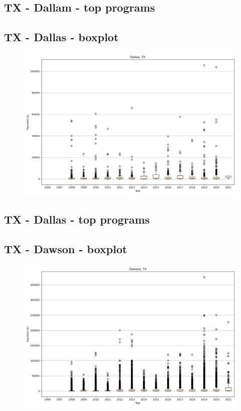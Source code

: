 \subsection*{TX - Dallam - top programs}

\newpage
\subsection*{TX - Dallas - boxplot}
\begin{figure}[h]
\centering
\includegraphics[width=7in]{../output/boxplots/counties/Dallas-TX_boxplot.png}
\end{figure}


\subsection*{TX - Dallas - top programs}

\newpage
\subsection*{TX - Dawson - boxplot}
\begin{figure}[h]
\centering
\includegraphics[width=7in]{../output/boxplots/counties/Dawson-TX_boxplot.png}
\end{figure}



